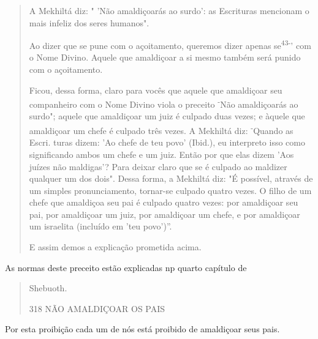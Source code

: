 \begin{quote}
A Mekhiltá diz: " 'Não amaldiçoarás ao surdo': as Escrituras mencio­nam
o mais infeliz dos seres humanos".

Ao dizer que se pune com o açoitamento, queremos dizer apenas
se\textsuperscript{43-}' com o Nome Divino. Aquele que amaldiçoar a si
mesmo também será pu­nido com o açoitamento.

Ficou, dessa forma, claro para vocês que aquele que amaldiçoar seu
companheiro com o Nome Divino viola o preceito \textsuperscript{-}Não
amaldiçoarás ao surdo"; aquele que amaldiçoar um juiz é culpado duas
vezes; e àquele que amaldiçoar um chefe é culpado três vezes. A Mekhiltá
diz: \textsuperscript{-}Quando as Escri­. turas dizem: 'Ao chefe de teu
povo' (Ibid.), eu interpreto isso como significan­do ambos um chefe e um
juiz. Então por que elas dizem 'Aos juízes não maldi­gas'? Para deixar
claro que se é culpado ao maldizer qualquer um dos dois". Dessa forma, a
Mekhiltá diz: "É possível, através de um simples pronuncia­mento,
tornar-se culpado quatro vezes. O filho de um chefe que amaldiçoa seu
pai é culpado quatro vezes: por amaldiçoar seu pai, por amaldiçoar um
juiz, por amaldiçoar um chefe, e por amaldiçoar um israelita (incluído
em 'teu povo')''.

E assim demos a explicação prometida acima.
\end{quote}

As normas deste preceito estão explicadas np quarto capítulo de

\begin{quote}
Shebuoth.

318 NÃO AMALDIÇOAR OS PAIS
\end{quote}

Por esta proibição cada um de nós está proibido de amaldiçoar seus pais.

